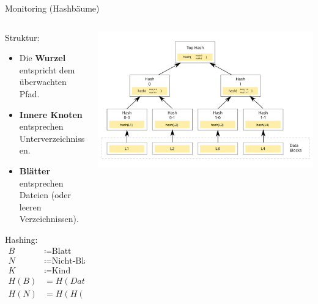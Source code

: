 \documentclass[
    ngerman,%
    authorontitle=true,
]{bfhbeamer}
\begin{document}
    \begin{frame}{Monitoring (Hashb\"aume)}
        \begin{columns}
            \begin{column}{0.5\textwidth}
                \item Struktur:
                \begin{itemize}
                    \item Die \textbf{Wurzel} entspricht dem überwachten Pfad.
                    \item \textbf{Innere Knoten} entsprechen Unterverzeichnissen.
                    \item \textbf{Blätter} entsprechen Dateien (oder leeren Verzeichnissen).
                \end{itemize}
                \item Hashing:
                \begin{align*}
                    B &\coloneqq \text{Blatt} \\
                    N &\coloneqq \text{Nicht-Blatt} \\
                    K &\coloneqq \text{Kind} \\
                    H(B) &= H(Datei)\\
                    H(N) &= H(H(K_1) \|H(K_2) \| \dots \|H(K_k))\\
                \end{align*}
            \end{column}
            \begin{column}{0.5\textwidth}
                \begin{center}
                    \includegraphics[width=1\textwidth]{assets/presentation/hashtree}
                \end{center}
            \end{column}
        \end{columns}
    \end{frame}
\end{document}
